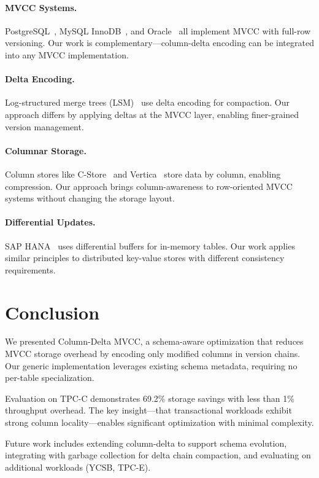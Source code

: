 \documentclass[letterpaper,twocolumn,10pt]{article}
\begin{document}
\paragraph{MVCC Systems.} PostgreSQL~\cite{postgresql}, MySQL InnoDB~\cite{mysql}, and Oracle~\cite{oracle} all implement MVCC with full-row versioning. Our work is complementary---column-delta encoding can be integrated into any MVCC implementation.

\paragraph{Delta Encoding.} Log-structured merge trees (LSM)~\cite{oneil1996log} use delta encoding for compaction. Our approach differs by applying deltas at the MVCC layer, enabling finer-grained version management.

\paragraph{Columnar Storage.} Column stores like C-Store~\cite{stonebraker2005c} and Vertica~\cite{vertica} store data by column, enabling compression. Our approach brings column-awareness to row-oriented MVCC systems without changing the storage layout.

\paragraph{Differential Updates.} SAP HANA~\cite{hana} uses differential buffers for in-memory tables. Our work applies similar principles to distributed key-value stores with different consistency requirements.

\section{Conclusion}
\label{sec:conclusion}

We presented Column-Delta MVCC, a schema-aware optimization that reduces MVCC storage overhead by encoding only modified columns in version chains. Our generic implementation leverages existing schema metadata, requiring no per-table specialization.

Evaluation on TPC-C demonstrates 69.2\% storage savings with less than 1\% throughput overhead. The key insight---that transactional workloads exhibit strong column locality---enables significant optimization with minimal complexity.

Future work includes extending column-delta to support schema evolution, integrating with garbage collection for delta chain compaction, and evaluating on additional workloads (YCSB, TPC-E).
\end{document}

